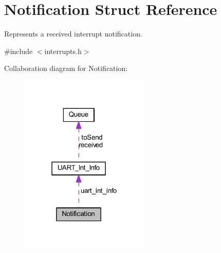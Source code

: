 \hypertarget{struct_notification}{}\section{Notification Struct Reference}
\label{struct_notification}


Represents a received interrupt notification.  




{\ttfamily \#include $<$interrupts.\+h$>$}



Collaboration diagram for Notification\+:\nopagebreak
\begin{figure}[H]
\begin{center}
\leavevmode
\includegraphics[width=175pt]{struct_notification__coll__graph}
\end{center}
\end{figure}
